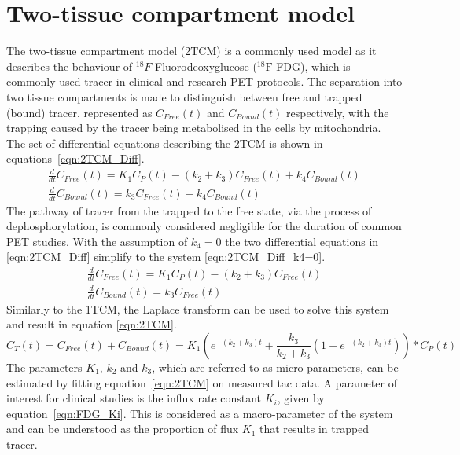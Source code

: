 \section{Two-tissue compartment model}
The two-tissue compartment model (2TCM) is a commonly used model as it describes the behaviour of ${}^{18}F$-Fluorodeoxyglucose (${}^{18}\mathrm{F}$-FDG), which is commonly used tracer in clinical and research PET protocols. The separation into two tissue compartments is made to distinguish between free and trapped (bound) tracer, represented as $C_{Free}(t)$ and $C_{Bound}(t)$ respectively, with the trapping caused by the tracer being metabolised in the cells by mitochondria. The set of differential equations describing the 2TCM is shown in equations~\ref{eqn:2TCM_Diff}.
%
\begin{subequations}
\begin{align}
\frac{d}{dt}C_{Free}(t) = K_1 C_P(t) - (k_2 + k_3)C_{Free}(t) + k_4 C_{Bound}(t) \\ 
\frac{d}{dt}C_{Bound}(t) = k_3 C_{Free}(t) - k_4 C_{Bound}(t)  
\end{align}
\label{eqn:2TCM_Diff}
\end{subequations}
%
The pathway of tracer from the trapped to the free state, via the process of dephosphorylation, is commonly considered negligible for the duration of common PET studies. With the assumption of $k_4=0$ the two differential equations in \ref{eqn:2TCM_Diff} simplify to the system \ref{eqn:2TCM_Diff_k4=0}. 
\begin{subequations}
\begin{align}
\frac{d}{dt}C_{Free}(t) = K_1 C_P(t) - (k_2 + k_3)C_{Free}(t) \\ 
\frac{d}{dt}C_{Bound}(t) = k_3 C_{Free}(t)  
\end{align}
\label{eqn:2TCM_Diff_k4=0}
\end{subequations}
Similarly to the 1TCM, the Laplace transform can be used to solve this system and result in equation \ref{eqn:2TCM}.
\begin{equation}
C_T(t) =  C_{Free}(t) + C_{Bound}(t) = K_1 \left( e^{-(k_2+k_3)t} + \frac{k_3}{k_2+k_3}(1-e^{-(k_2+k_3)t})\right) \ast C_P(t)   
\label{eqn:2TCM}
\end{equation}
%
The parameters $K_1$, $k_2$ and $k_3$, which are referred to as micro-parameters, can be estimated by fitting equation~\ref{eqn:2TCM} on measured \gls{tac} data. 
%
A parameter of interest for clinical studies is the influx rate constant $K_i$, given by equation~\ref{eqn:FDG_Ki}. This is considered as a macro-parameter of the system and can be understood as the proportion of flux $K_1$ that results in trapped tracer.
